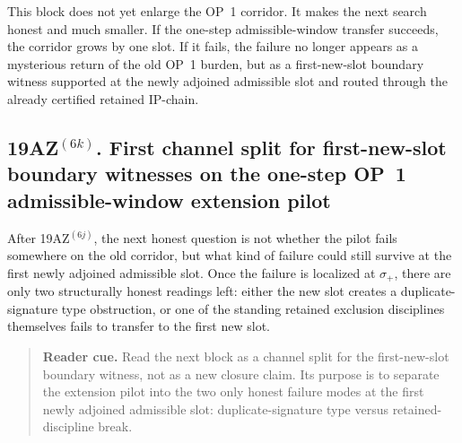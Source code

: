 \begin{remark}
\label{rem:what-first-extension-boundary-localization-buys}
This block does not yet enlarge the OP~1 corridor. It makes the next search honest and much smaller. If the one-step admissible-window transfer succeeds, the corridor grows by one slot. If it fails, the failure no longer appears as a mysterious return of the old OP~1 burden, but as a first-new-slot boundary witness supported at the newly adjoined admissible slot and routed through the already certified retained IP-chain.
\end{remark}



\subsection*{19AZ$^{(6k)}$. First channel split for first-new-slot boundary witnesses on the one-step OP~1 admissible-window extension pilot}
\label{sec:first-channel-split-first-new-slot-boundary-witnesses-one-step-op1-pilot}
After 19AZ$^{(6j)}$, the next honest question is not whether the pilot fails somewhere on the old corridor, but what kind of failure could still survive at the first newly adjoined admissible slot. Once the failure is localized at $\sigma_{+}$, there are only two structurally honest readings left: either the new slot creates a duplicate-signature type obstruction, or one of the standing retained exclusion disciplines themselves fails to transfer to the first new slot.

\begin{quote}\small
\noindent\textbf{Reader cue.} Read the next block as a channel split for the first-new-slot boundary witness, not as a new closure claim. Its purpose is to separate the extension pilot into the two only honest failure modes at the first newly adjoined admissible slot: duplicate-signature type versus retained-discipline break.
\end{quote}

